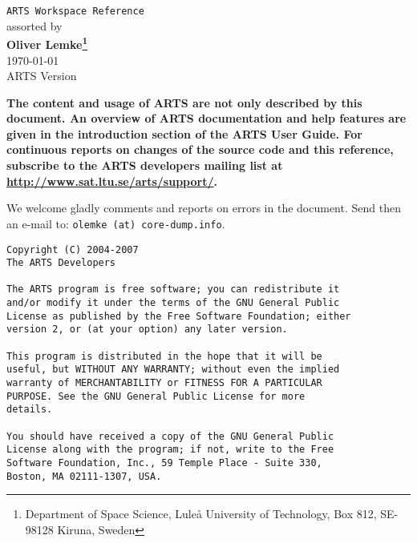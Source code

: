 





%
\renewcommand{\thepage}{title \arabic{page}} 

\thispagestyle{plain}
\begin{center}
  \vspace*{2cm}
  {\Huge \verb|ARTS Workspace Reference|\\}
  \vspace*{1cm}
  {\large assorted by \\}
  \vspace*{1cm}
  {\Large \bf Oliver Lemke\footnote{
      Department of Space Science, Lule{\aa} University of Technology,
      Box 812, SE-98128 Kiruna, Sweden}  
    }\\
   \vspace*{2cm}
   {\large \today\\
    ARTS Version 
   }
\end{center}
\vspace*{4cm}
{\normalsize \bf
  \noindent
  The content and usage of ARTS are not only described by this
  document. An overview of ARTS documentation and help features are
  given in the introduction section of the ARTS User Guide. For continuous
  reports on changes of the source code and this reference, subscribe to
  the ARTS developers mailing list at \url{http://www.sat.ltu.se/arts/support/}.

  We welcome gladly comments and reports on errors in the document.
  Send then an e-mail to: \verb|olemke (at) core-dump.info|.
}

\newpage                          
\thispagestyle{empty}
\vspace*{\fill}
\noindent
\begin{verbatim}
Copyright (C) 2004-2007
The ARTS Developers

The ARTS program is free software; you can redistribute it
and/or modify it under the terms of the GNU General Public
License as published by the Free Software Foundation; either
version 2, or (at your option) any later version.

This program is distributed in the hope that it will be
useful, but WITHOUT ANY WARRANTY; without even the implied
warranty of MERCHANTABILITY or FITNESS FOR A PARTICULAR
PURPOSE. See the GNU General Public License for more
details. 

You should have received a copy of the GNU General Public
License along with the program; if not, write to the Free
Software Foundation, Inc., 59 Temple Place - Suite 330,
Boston, MA 02111-1307, USA. 
\end{verbatim}



